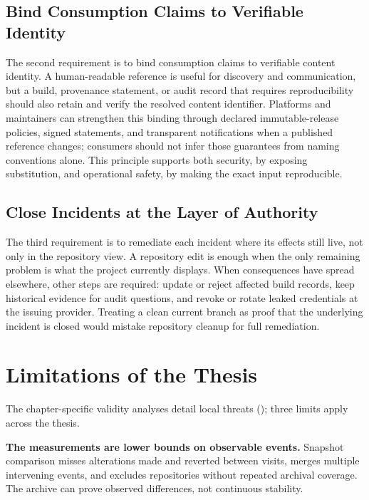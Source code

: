 \subsection{Bind Consumption Claims to Verifiable Identity}
\label{subsec:concl-impl-developers}

The second requirement is to bind consumption claims to verifiable content identity.
A human-readable reference is useful for discovery and communication, but a build, provenance statement, or audit record that requires reproducibility should also retain and verify the resolved content identifier.
Platforms and maintainers can strengthen this binding through declared immutable-release policies, signed statements, and transparent notifications when a published reference changes; consumers should not infer those guarantees from naming conventions alone.
This principle supports both security, by exposing substitution, and operational safety, by making the exact input reproducible.

\subsection{Close Incidents at the Layer of Authority}
\label{subsec:concl-impl-downstream}

The third requirement is to remediate each incident where its effects still live, not only in the repository view.
A repository edit is enough when the only remaining problem is what the project currently displays.
When consequences have spread elsewhere, other steps are required: update or reject affected build records, keep historical evidence for audit questions, and revoke or rotate leaked credentials at the issuing provider.
Treating a clean current branch as proof that the underlying incident is closed would mistake repository cleanup for full remediation.

\section{Limitations of the Thesis}
\label{sec:concl-limitations}

The chapter-specific validity analyses detail local threats (); three limits apply across the thesis.

\textbf{The measurements are lower bounds on observable events.}
Snapshot comparison misses alterations made and reverted between visits, merges multiple intervening events, and excludes repositories without repeated archival coverage.
The archive can prove observed differences, not continuous stability.

